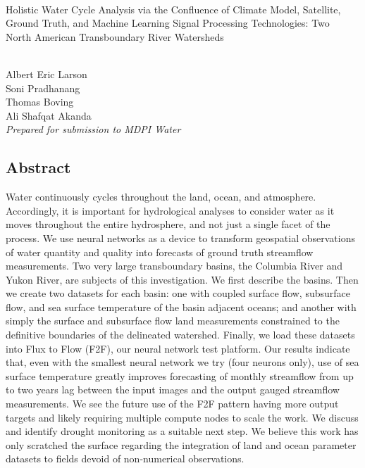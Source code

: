 

\begin{refsection}
\begin{center}
\hspace{}
\\[1.0 in]
Holistic Water Cycle Analysis via the Confluence of Climate Model, Satellite, \\
Ground Truth, and Machine Learning Signal Processing Technologies: Two \\
North American Transboundary River Watersheds

\\[1.0 in]

Albert Eric Larson \\ 
Soni Pradhanang \\
Thomas Boving \\ 
Ali Shafqat Akanda \\[1.0 in]
\emph{Prepared for submission to MDPI Water}



\end{center}
\newpage

\subsection{Abstract}
Water continuously cycles throughout the land, ocean, and atmosphere. Accordingly, it is important for hydrological analyses to consider water as it moves throughout the entire hydrosphere, and not just a single facet of the process. We use neural networks as a device to transform geospatial observations of water quantity and quality into forecasts of ground truth streamflow measurements. Two very large transboundary basins, the Columbia River and Yukon River, are subjects of this investigation. We first describe the basins. Then we create two datasets for each basin: one with coupled surface flow, subsurface flow, and sea surface temperature of the basin adjacent oceans; and another with simply the surface and subsurface flow land measurements constrained to the definitive boundaries of the delineated watershed. Finally, we load these datasets into Flux to Flow (F2F), our neural network test platform. Our results indicate that, even with the smallest neural network we try (four neurons only), use of sea surface temperature greatly improves forecasting of monthly streamflow from up to two years lag between the input images and the output gauged streamflow measurements. We see the future use of the F2F pattern having more output targets and likely requiring multiple compute nodes to scale the work. We discuss and identify drought monitoring as a suitable next step. We believe this work has only scratched the surface regarding the integration of land and ocean parameter datasets to fields devoid of non-numerical observations.


\end{refsection}
